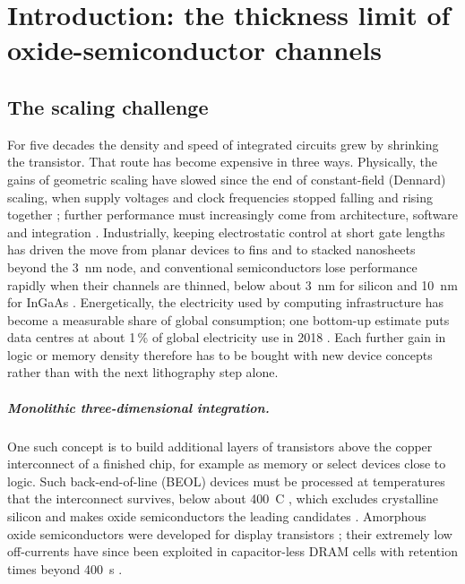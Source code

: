 \chapter{Introduction: the thickness limit of oxide-semiconductor channels}
\label{ch:mono-intro}

\section{The scaling challenge}
\label{sec:mono-intro-scaling}

For five decades the density and speed of integrated circuits grew by shrinking the transistor. That route has become
expensive in three ways. Physically, the gains of geometric scaling have slowed since the end of constant-field
(Dennard) scaling, when supply voltages and clock frequencies stopped falling and rising together
\citep{Theis2017}; further performance must increasingly come from architecture, software and integration
\citep{Leiserson2020,Salahuddin2018}. Industrially, keeping electrostatic control at short gate lengths has driven the
move from planar devices to fins and to stacked nanosheets beyond the 3~nm node, and conventional semiconductors lose
performance rapidly when their channels are thinned, below about 3~nm for silicon and 10~nm for InGaAs
\citep[p.~164]{Si2022}. Energetically, the electricity used by computing infrastructure has become a measurable share of
global consumption; one bottom-up estimate puts data centres at about 1\,\% of global electricity use in 2018
\citep{Masanet2020}. Each further gain in logic or memory density therefore has to be bought with new device concepts
rather than with the next lithography step alone.

\paragraph{Monolithic three-dimensional integration.} One such concept is to build additional layers of transistors
above the copper interconnect of a finished chip, for example as memory or select devices close to logic. Such
back-end-of-line (BEOL) devices must be processed at temperatures that the interconnect survives, below about 400~\textdegree C
\citep[p.~1]{Januar2026}, which excludes crystalline silicon and makes oxide semiconductors the leading candidates
\citep{Datta2019,Salahuddin2018}. Amorphous oxide semiconductors were developed for display transistors
\citep{Nomura2004,Kamiya2010,Fortunato2012}; their extremely low off-currents have since been exploited in
capacitor-less DRAM cells with retention times beyond 400~s \citep{Belmonte2020}.

